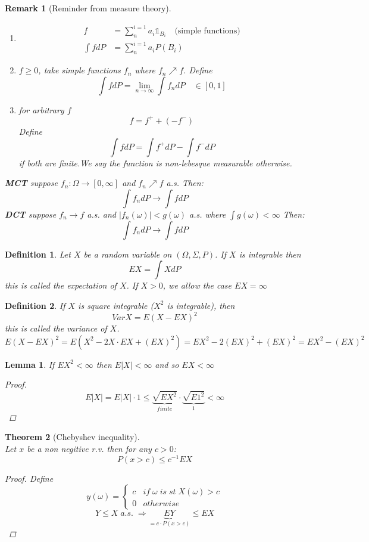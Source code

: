 \documentclass[12pt]{article}
\newtheorem{theorem}{Theorem}[section]
\newtheorem{lemma}[theorem]{Lemma}
\newtheorem{definition}{Definition}[section]
\newtheorem*{remark}{Remark}
\begin{document}
\begin{remark}[Reminder from measure theory]\quad \\
\begin{enumerate}  
\item \begin{align*} f &= \sum_{n}^{i=1}a_i{\mathbb 1}_{B_i} \quad \text{(simple functions)}\\
\int f dP &= \sum_{n}^{i=1}a_iP(B_i) \end{align*}
\item $f \geq 0 $, take simple functions $f_n$ where $f_n \nearrow f$. Define
\[\int f dP = \lim_{n \rightarrow \infty}\int f_n dP \quad \in [0,1]\]
\item for arbitrary $f$
\[ f = f^{+}+ ( - f^{-}) \]
Define
\[\int f dP = \int f^{+} dP  - \int f^{-} dP\]
if both are finite.We say the function is non-lebesque measurable otherwise.
\end{enumerate}
\textbf{MCT} suppose $f_n: \Omega \rightarrow [0,\infty]$ and $f_n \nearrow f$ a.s. Then:
\[\int f_n dP \rightarrow \int f dP\]
\textbf{DCT} suppose $f_n \rightarrow f$ a.s. and $|f_n(\omega)| < g(\omega)$ a.s. where $\int g(\omega) < \infty$ Then:
\[\int f_n dP \rightarrow \int f dP\]
\end{remark}

\begin{definition}
Let $X$ be a random variable on $(\Omega , \Sigma , P)$. If $X$ is integrable then \[EX = \int X dP \]
this is called the expectation of $X$. If $X >0$, we allow the case $EX = \infty$
\end{definition}
\begin{definition}
 If $X$ is square integrable ($X^2$ is integrable), then \[VarX =E (X - EX)^2 \]
this is called the variance of $X$. 
\[E (X - EX)^2 = E (X^2 -2X\cdot EX + (EX)^2) = EX^2 -2( EX)^2 + (EX)^2 = EX^2 -( EX)^2\]
\end{definition}

\begin{lemma}If $EX^2< \infty$ then $E|X|<\infty$ and so $EX < \infty$
\begin{proof}
\[E|X| = E|X|\cdot 1 \leq \underbrace{\sqrt{EX^2}}_{finite} \cdot \underbrace{\sqrt{E1^2}}_{1} < \infty\]
\end{proof}
\end{lemma}

\begin{theorem}[Chebyshev inequality] \quad\\
Let $x$ be a non negitive r.v. then for any $c>0$:
\[P(x>c) \leq c^{-1}EX\]
\begin{proof}
Define \[y(\omega) = \begin{cases} c & if \; \omega \;  is \; st \;X(\omega)>c\\
0 & otherwise \end{cases} \]
\[Y\leq X \; a.s.\; \Rightarrow \underbrace{EY}_{ = c\cdot P(x>c)} \leq EX\]
\end{proof}
\end{theorem} 
\end{document}

